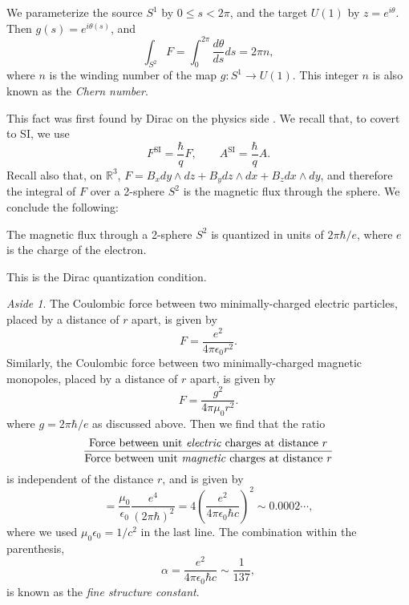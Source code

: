 \documentclass[12pt]{article}
\numberwithin{equation}{section}
\numberwithin{figure}{section}
\theoremstyle{remark}
\newtheorem{aside}[definition]{Aside}
\def\bR{\mathbb{R}}
\begin{document}
We parameterize the source $S^1$ by $0\le s < 2\pi$,
and the target $U(1)$ by $z=e^{i\theta}$.
Then $g(s)=e^{i\theta(s)}$, and \begin{equation}
\int_{S^2} F = \int_0^{2\pi} \frac{d\theta}{ds} ds = 2\pi n,
\end{equation}
where $n$ is the winding number of the map $g:S^1\to U(1)$.
This integer $n$ is also known as the \emph{Chern number}.

This fact was first found by Dirac on the physics side \cite{Dirac}.
We recall that, to covert to SI, we use \begin{equation}
  F^\text{SI} = \frac{\hbar}{q} F,\qquad
  A^\text{SI} = \frac{\hbar}{q} A.
\end{equation} 
Recall also that, on $\bR^3$,
$F=B_{x}dy\wedge dz + B_{y}dz\wedge dx + B_{z}dx\wedge dy$,
and therefore the integral of $F$ over a 2-sphere $S^2$ is the magnetic flux through the sphere.
We conclude the following:
\begin{proposition}
The magnetic flux through a 2-sphere $S^2$ is quantized in units of $2\pi \hbar/e$,
where $e$ is the charge of the electron.
\end{proposition}
This is the Dirac quantization condition.

\begin{aside}
The Coulombic force between two minimally-charged electric particles, 
placed by a distance of $r$ apart, is given by \begin{equation}
  F = \frac{e^2}{4\pi \epsilon_0 r^2}.
\end{equation} 
Similarly, the Coulombic force between two minimally-charged magnetic monopoles,
placed by a distance of $r$ apart, is given by \begin{equation}
  F = \frac{g^2}{4\pi \mu_0 r^2}.
\end{equation} where $g=2\pi \hbar/e$ as discussed above.
Then we find that the ratio \begin{equation}
\frac{\text{Force between unit \emph{electric} charges at distance $r$}}
{\text{Force between unit \emph{magnetic} charges at distance $r$}}
\end{equation}
is independent of the distance $r$, and is given by 
\begin{equation}
= \frac{\mu_0}{\epsilon_0} \frac{e^4}{(2\pi \hbar)^2}
= 4 (\frac{e^2}{4\pi \epsilon_0 \hbar c })^2 \sim 0.0002\cdots,
\end{equation} 
where we used $\mu_0 \epsilon_0=1/c^2$ in the last line.
The combination within the parenthesis, \begin{equation}
\alpha = \frac{e^2}{4\pi \epsilon_0 \hbar c } \sim \frac{1}{137},
\end{equation} is known as the \emph{fine structure constant}.
\end{aside}
\end{document}
